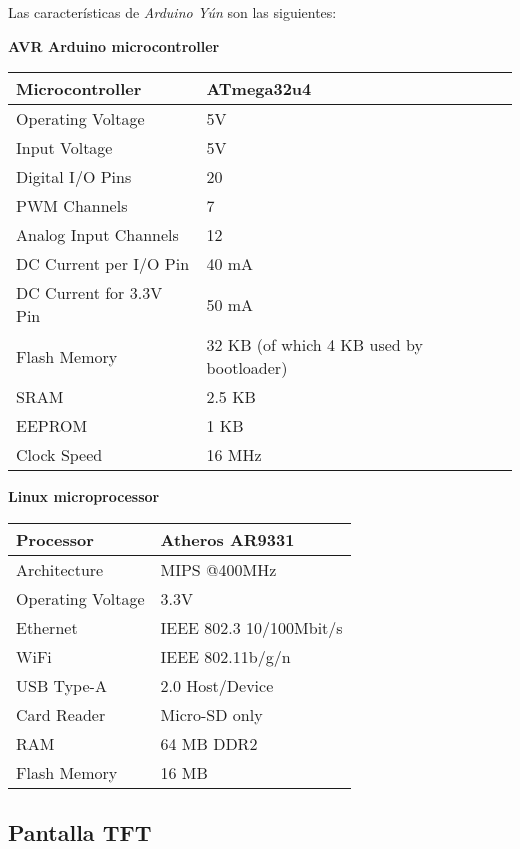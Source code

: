 Las características de \emph{Arduino Yún} son las siguientes:

\textbf{AVR Arduino microcontroller}

\begin{tabular}{| l | l |}
\hline
Microcontroller & ATmega32u4 \\ \hline
Operating Voltage & 5V \\ \hline
Input Voltage & 5V \\ \hline
Digital I/O Pins & 20 \\ \hline
PWM Channels & 7 \\ \hline
Analog Input Channels & 12 \\ \hline
DC Current per I/O Pin & 40 mA \\ \hline
DC Current for 3.3V Pin & 50 mA \\ \hline
Flash Memory & 32 KB (of which 4 KB used by bootloader) \\ \hline
SRAM & 2.5 KB \\ \hline
EEPROM & 1 KB \\ \hline
Clock Speed & 16 MHz \\ \hline
\end{tabular}

\textbf{Linux microprocessor}

\begin{tabular}{| l | l |}
\hline
Processor & Atheros AR9331 \\ \hline
Architecture & MIPS @400MHz \\ \hline
Operating Voltage & 3.3V \\ \hline
Ethernet & IEEE 802.3 10/100Mbit/s \\ \hline
WiFi & IEEE 802.11b/g/n \\ \hline
USB Type-A & 2.0 Host/Device \\ \hline
Card Reader & Micro-SD only \\ \hline
RAM & 64 MB DDR2 \\ \hline
Flash Memory & 16 MB \\ \hline
\end{tabular}


\subsection{Pantalla TFT}
